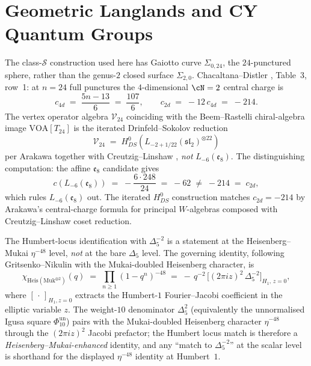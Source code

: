 \chapter{Geometric Langlands and CY Quantum Groups}
\label{ch:geometric-langlands}

\begin{remark}
\label{rem:gaiotto-curve-correction}
The class-$\mathcal{S}$ construction used here has Gaiotto curve $\Sigma_{0,24}$, the $24$-punctured sphere, rather than the genus-$2$ closed surface $\Sigma_{2,0}$. Chacaltana--Distler \cite{ChacaltanaDistler2010}, Table~3, row~1: at $n = 24$ full punctures the $4$-dimensional $\cN = 2$ central charge is
\[
c_{4d} \;=\; \frac{5n - 13}{6} \;=\; \frac{107}{6},
\qquad c_{2d} \;=\; -12\, c_{4d} \;=\; -214.
\]
The vertex operator algebra $\mathcal{V}_{24}$ coinciding with the Beem--Rastelli \cite{BeemRastelli2014} chiral-algebra image $\mathrm{VOA}[T_{24}]$ is the iterated Drinfeld--Sokolov reduction
\[
\mathcal{V}_{24} \;=\; H^0_{DS}\!\left( L_{-2 + 1/22}(\mathfrak{sl}_2)^{\otimes 22} \right)
\]
per Arakawa \cite{Arakawa2017} together with Creutzig--Linshaw \cite{CreutzigLinshaw2017}, \emph{not} $L_{-6}(\mathfrak{e}_8)$. The distinguishing computation: the affine $\mathfrak{e}_8$ candidate gives
\[
c\!\left(L_{-6}(\mathfrak{e}_8)\right) \;=\; -\frac{6 \cdot 248}{24} \;=\; -62 \;\neq\; -214 \;=\; c_{2d},
\]
which rules $L_{-6}(\mathfrak{e}_8)$ out. The iterated $H^0_{DS}$ construction matches $c_{2d} = -214$ by Arakawa's central-charge formula for principal $W$-algebras composed with Creutzig--Linshaw coset reduction.
\end{remark}

\begin{remark}
\label{rem:humbert-heisenberg-mukai}
The Humbert-locus identification with $\Delta_5^{-2}$ is a statement at the Heisenberg--Mukai $\eta^{-48}$ level, \emph{not} at the bare $\Delta_5$ level. The governing identity, following Gritsenko--Nikulin \cite{GritsenkoNikulin1996} with the Mukai-doubled Heisenberg character, is
\[
\chi_{\mathrm{Heis}(\mathrm{Muk}^{\oplus 2})}(q)
\;=\; \prod_{n \geq 1} (1 - q^n)^{-48}
\;=\; -\, q^{-2}\, \bigl[ (2\pi i z)^2\, \Delta_5^{-2} \bigr]_{H_1,\, z = 0},
\]
where $[\,\cdot\,]_{H_1, z=0}$ extracts the Humbert-$1$ Fourier--Jacobi coefficient in the elliptic variable $z$. The weight-$10$ denominator $\Delta_5^2$ (equivalently the unnormalised Igusa square $\Phi_{10}^{\mathrm{un}}$) pairs with the Mukai-doubled Heisenberg character $\eta^{-48}$ through the $(2\pi i z)^2$ Jacobi prefactor; the Humbert locus match is therefore a \emph{Heisenberg--Mukai-enhanced} identity, and any ``match to $\Delta_5^{-2}$'' at the scalar level is shorthand for the displayed $\eta^{-48}$ identity at Humbert~$1$.
\end{remark}


